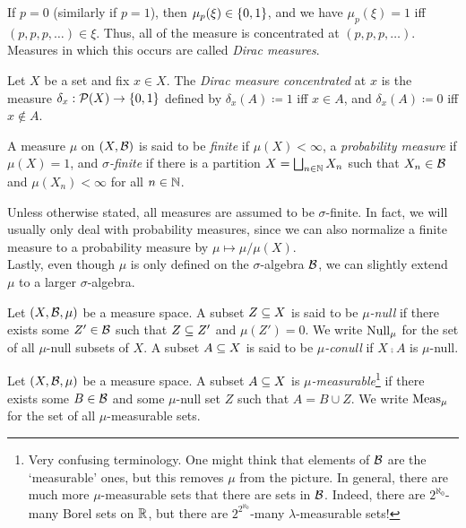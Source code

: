 \documentclass[reqno, twoside]{article}
\begin{document}
    If $p=0$ (similarly if $p=1$), then $\mu_p(\xi)\in\left\{0,1\right\}$, and we have $\mu_p(\xi)=1$ iff $(p,p,p,\ldots)\in\xi$. Thus, all of the measure is concentrated at $(p,p,p,\ldots)$. Measures in which this occurs are called \textit{Dirac measures}.

    \begin{example}[Dirac]
        Let $X$ be a set and fix $x\in X$. The \textit{Dirac measure concentrated} at $x$ is the measure $\delta_x:\mathcal{P}(X)\to\left\{0,1\right\}$ defined by $\delta_x(A)\coloneqq1$ iff $x\in A$, and $\delta_x(A)\coloneqq0$ iff $x\not\in A$.
    \end{example}

    \begin{definition}
        A measure $\mu$ on $(X,\mathcal{B})$ is said to be \textit{finite} if $\mu(X)<\infty$, a \textit{probability measure} if $\mu(X)=1$, and \textit{$\sigma$-finite} if there is a partition $X=\bigsqcup_{n\in\mathbb{N}}X_n$ such that $X_n\in\mathcal{B}$ and $\mu(X_n)<\infty$ for all $n\in\mathbb{N}$.
    \end{definition}

    Unless otherwise stated, all measures are assumed to be $\sigma$-finite. In fact, we will usually only deal with probability measures, since we can also normalize a finite measure to a probability measure by $\mu\mapsto\mu/\mu(X)$.\\

    Lastly, even though $\mu$ is only defined on the $\sigma$-algebra $\mathcal{B}$, we can slightly extend $\mu$ to a larger $\sigma$-algebra.

    \begin{definition}
        Let $(X,\mathcal{B},\mu)$ be a measure space. A subset $Z\subseteq X$ is said to be \textit{$\mu$-null} if there exists some $Z'\in\mathcal{B}$ such that $Z\subseteq Z'$ and $\mu(Z')=0$. We write $\operatorname{Null}_\mu$ for the set of all $\mu$-null subsets of $X$. A subset $A\subseteq X$ is said to be \textit{$\mu$-conull} if $X\comp A$ is $\mu$-null.
    \end{definition}

    \begin{definition}
        Let $(X,\mathcal{B},\mu)$ be a measure space. A subset $A\subseteq X$ is \textit{$\mu$-measurable}\footnote{Very confusing terminology. One might think that elements of $\mathcal{B}$ are the `measurable' ones, but this removes $\mu$ from the picture. In general, there are much more $\mu$-measurable sets that there are sets in $\mathcal{B}$. Indeed, there are $2^{\aleph_0}$-many Borel sets on $\mathbb{R}$, but there are $2^{2^{\aleph_0}}$-many $\lambda$-measurable sets!} if there exists some $B\in\mathcal{B}$ and some $\mu$-null set $Z$ such that $A=B\cup Z$. We write $\operatorname{Meas}_\mu$ for the set of all $\mu$-measurable sets.
    \end{definition}
\end{document}
